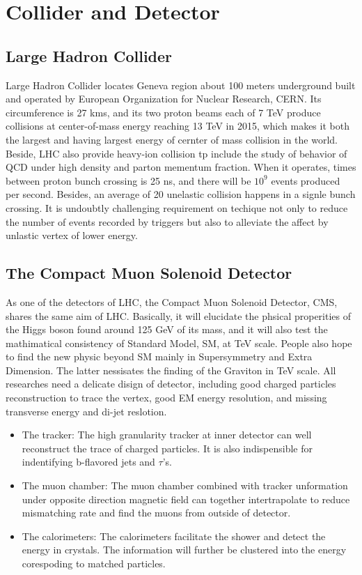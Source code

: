 
\chapter{Collider and Detector} \label{Detector}

\section{Large Hadron Collider}%
Large Hadron Collider locates Geneva region about 100 meters underground built and operated by European Organization for Nuclear Research, CERN. 
Its circumference is 27 kms, and its two proton beams each of 7 TeV produce collisions at center-of-mass energy reaching 13 TeV in 2015, 
which makes it both the largest and having largest energy of cernter of mass collision in the world.
Beside, LHC also provide heavy-ion collision tp include the study of behavior of QCD under high density and parton mementum fraction. 
When it operates, times between proton bunch crossing is 25 ns, and there will be $10^9$ events produced per second. 
Besides, an average of 20 unelastic collision happens in a signle bunch crossing.
It is undoubtly challenging requirement on techique not only to reduce the number of events recorded by triggers but also to alleviate the affect by unlastic vertex of lower energy.

\section{The Compact Muon Solenoid Detector}

As one of the detectors of LHC, the Compact Muon Solenoid Detector, CMS, shares the same aim of LHC.
Basically, it will elucidate the phsical properities of the Higgs boson found around 125 GeV of its mass, and it will also test the mathimatical consistency of Standard Model, SM, at TeV scale.
People also hope to find the new physic beyond SM mainly in Supersymmetry and Extra Dimension. The latter nessisates the finding of the Graviton in TeV scale.
All researches need a delicate disign of detector, including good charged particles reconstruction to trace the vertex, good EM energy resolution, and missing transverse energy and di-jet reslotion.
\begin{itemize}
\item The tracker: The high granularity tracker at inner detector can well reconstruct the trace of charged particles. It is also indispensible for indentifying b-flavored jets and $\tau$'s.  
\item The muon chamber: The muon chamber combined with tracker unformation under opposite direction magnetic field can together intertrapolate to reduce mismatching rate and find the muons from outside of detector.
\item The calorimeters: The calorimeters facilitate the shower and detect the energy in crystals. The information will further be clustered into the energy corespoding to matched particles.
\end{itemize}

